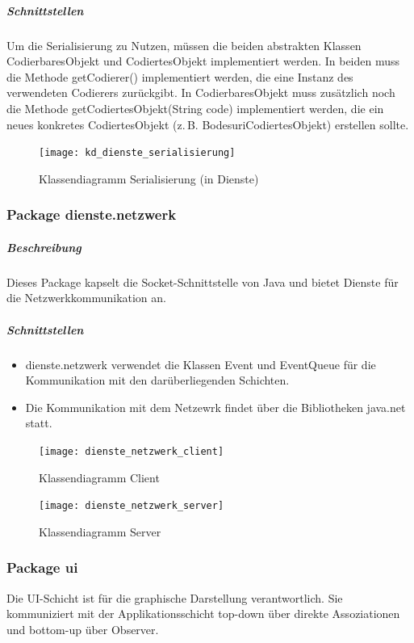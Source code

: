 \documentclass[12pt,halfparskip]{scrartcl}
\begin{document}
\subparagraph{Schnittstellen}
Um die Serialisierung zu Nutzen, müssen die beiden abstrakten Klassen CodierbaresObjekt und CodiertesObjekt implementiert werden. In beiden muss die Methode getCodierer() implementiert werden, die eine Instanz des verwendeten Codierers zurückgibt. In CodierbaresObjekt muss zusätzlich noch die Methode getCodiertesObjekt(String code) implementiert werden, die ein neues konkretes CodiertesObjekt (z.\,B. BodesuriCodiertesObjekt) erstellen sollte.

\begin{figure}[h]
	\centering
	\texttt{[image: kd\_dienste\_serialisierung]}
	\caption{Klassendiagramm Serialisierung (in Dienste)}
	\label{fig:kd_dienste_serialisierung}
\end{figure}

\clearpage
\subsubsection{Package dienste.netzwerk} %
\label{ssub:package_dienste_netzwerk}
\subparagraph{Beschreibung}
Dieses Package kapselt die Socket-Schnittstelle von Java und bietet Dienste für die Netzwerkkommunikation an.

\subparagraph{Schnittstellen} %
\label{ssub:schnittstellen}
\begin{itemize}
	\item dienste.netzwerk verwendet die Klassen Event und EventQueue für die Kommunikation mit den darüberliegenden Schichten.
	\item Die Kommunikation mit dem Netzewrk findet über die Bibliotheken java.net statt.
\end{itemize}

\begin{figure}[h]
	\centering
	\texttt{[image: dienste\_netzwerk\_client]}
	\caption{Klassendiagramm Client}
	\label{fig:dienste_netzwerk_client}
\end{figure}

\begin{figure}[h]
	\centering
	\texttt{[image: dienste\_netzwerk\_server]}
	\caption{Klassendiagramm Server}
	\label{fig:dienste_netzwerk_server}
\end{figure}


\clearpage
\subsubsection{Package ui} %
\label{ssub:package_ui}
Die UI-Schicht ist für die graphische Darstellung verantwortlich. Sie kommuniziert mit der Applikationsschicht top-down über direkte Assoziationen und bottom-up über Observer.
\end{document}
